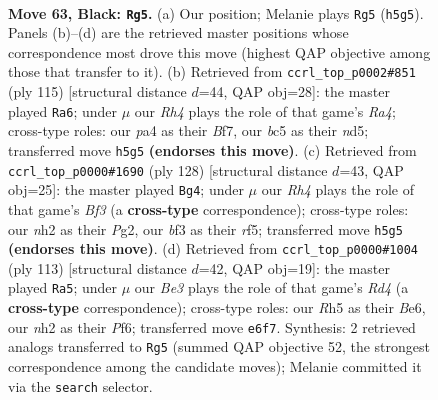\documentclass[11pt]{article}
\begin{document}
\clearpage

\begin{figure}[p]\centering
\begin{subfigure}{0.46\textwidth}\centering
\resizebox{\linewidth}{!}{%
\newchessgame
\chessboard[
  setfen={8/2k5/4b3/2B4r/PK6/1P3B1p/5R1N/8 b - - 5 63},
  showmover=false,
  pgfstyle=straightmove, color=movearrow, markmove={h5-g5}
]}
\caption{}
\end{subfigure}\hfill
\begin{subfigure}{0.46\textwidth}\centering
\resizebox{\linewidth}{!}{%
\newchessgame
\chessboard[
  setfen={8/1p1k1b2/8/r2N3p/2P2P2/pB6/K7/4B3 b - - 10 58},
  showmover=false,
  pgfstyle=straightmove, color=movearrow, markmove={a5-a6}
]}
\caption{}
\end{subfigure}
\\[4pt]
\begin{subfigure}{0.46\textwidth}\centering
\resizebox{\linewidth}{!}{%
\newchessgame
\chessboard[
  setfen={8/4pk2/R5p1/3b1r2/7P/4KB2/6P1/8 w - - 9 65},
  showmover=false,
  pgfstyle=straightmove, color=movearrow, markmove={f3-g4}
]}
\caption{}
\end{subfigure}\hfill
\begin{subfigure}{0.46\textwidth}\centering
\resizebox{\linewidth}{!}{%
\newchessgame
\chessboard[
  setfen={5k2/5p2/4bp2/3r4/4RB2/4K2P/6P1/8 b - - 8 57},
  showmover=false,
  pgfstyle=straightmove, color=movearrow, markmove={d5-a5}
]}
\caption{}
\end{subfigure}
\caption{\textbf{Move 63, Black: \texttt{Rg5}.} (a) Our position; Melanie plays \texttt{Rg5} (\texttt{h5g5}). Panels (b)--(d) are the retrieved master positions whose correspondence most drove this move (highest QAP objective among those that transfer to it). (b) Retrieved from \texttt{ccrl\_top\_p0002\#851} (ply 115) [structural distance $d$=44, QAP obj=28]: the master played \texttt{Ra6}; under $\mu$ our \emph{Rh4} plays the role of that game's \emph{Ra4}; cross-type roles: our \emph{p}a4 as their \emph{B}f7, our \emph{b}c5 as their \emph{n}d5; transferred move \texttt{h5g5} \textbf{(endorses this move)}. (c) Retrieved from \texttt{ccrl\_top\_p0000\#1690} (ply 128) [structural distance $d$=43, QAP obj=25]: the master played \texttt{Bg4}; under $\mu$ our \emph{Rh4} plays the role of that game's \emph{Bf3} (a \textbf{cross-type} correspondence); cross-type roles: our \emph{n}h2 as their \emph{P}g2, our \emph{b}f3 as their \emph{r}f5; transferred move \texttt{h5g5} \textbf{(endorses this move)}. (d) Retrieved from \texttt{ccrl\_top\_p0000\#1004} (ply 113) [structural distance $d$=42, QAP obj=19]: the master played \texttt{Ra5}; under $\mu$ our \emph{Be3} plays the role of that game's \emph{Rd4} (a \textbf{cross-type} correspondence); cross-type roles: our \emph{R}h5 as their \emph{B}e6, our \emph{n}h2 as their \emph{P}f6; transferred move \texttt{e6f7}. Synthesis: 2 retrieved analogs transferred to \texttt{Rg5} (summed QAP objective 52, the strongest correspondence among the candidate moves); Melanie committed it via the \texttt{search} selector.}
\label{fig:thought-m125}
\end{figure}
\end{document}
